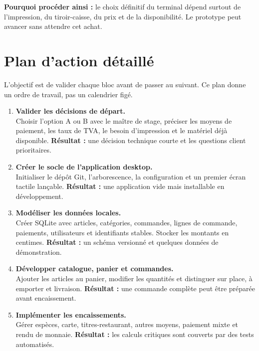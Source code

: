 \documentclass[11pt,a4paper]{article}
\begin{document}
\textbf{Pourquoi procéder ainsi :} le choix définitif du terminal dépend surtout de l'impression,
du tiroir-caisse, du prix et de la disponibilité. Le prototype peut avancer sans attendre cet achat.

\section{Plan d'action détaillé}

L'objectif est de valider chaque bloc avant de passer au suivant. Ce plan donne un ordre de travail,
pas un calendrier figé.

\begin{enumerate}
  \item \textbf{Valider les décisions de départ.}\\
  Choisir l'option A ou B avec le maître de stage, préciser les moyens de paiement, les taux de TVA,
  le besoin d'impression et le matériel déjà disponible. \textbf{Résultat :} une décision technique
  courte et les questions client prioritaires.

  \item \textbf{Créer le socle de l'application desktop.}\\
  Initialiser le dépôt Git, l'arborescence, la configuration et un premier écran tactile lançable.
  \textbf{Résultat :} une application vide mais installable en développement.

  \item \textbf{Modéliser les données locales.}\\
  Créer SQLite avec articles, catégories, commandes, lignes de commande, paiements, utilisateurs
  et identifiants stables. Stocker les montants en centimes. \textbf{Résultat :} un schéma versionné
  et quelques données de démonstration.

  \item \textbf{Développer catalogue, panier et commandes.}\\
  Ajouter les articles au panier, modifier les quantités et distinguer sur place, à emporter et
  livraison. \textbf{Résultat :} une commande complète peut être préparée avant encaissement.

  \item \textbf{Implémenter les encaissements.}\\
  Gérer espèces, carte, titres-restaurant, autres moyens, paiement mixte et rendu de monnaie.
  \textbf{Résultat :} les calculs critiques sont couverts par des tests automatisés.


\end{enumerate}
\end{document}
